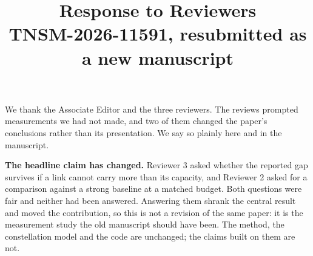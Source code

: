 \documentclass[11pt]{article}
\title{\vspace{-2em}Response to Reviewers\\[2pt]
\large TNSM-2026-11591, resubmitted as a new manuscript}
\date{}
\begin{document}
\maketitle

We thank the Associate Editor and the three reviewers. The reviews prompted measurements we had
not made, and two of them changed the paper's conclusions rather than its presentation. We say so
plainly here and in the manuscript.

\textbf{The headline claim has changed.} Reviewer 3 asked whether the reported gap survives if a
link cannot carry more than its capacity, and Reviewer 2 asked for a comparison against a strong
baseline at a matched budget. Both questions were fair and neither had been answered. Answering
them shrank the central result and moved the contribution, so this is not a revision of the same
paper: it is the measurement study the old manuscript should have been. The method, the
constellation model and the code are unchanged; the claims built on them are not.
\end{document}
